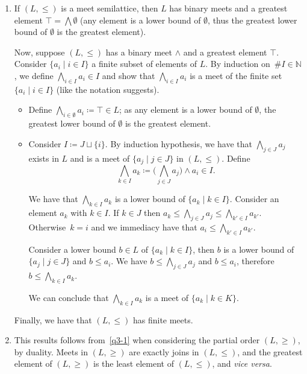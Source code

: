 \documentclass[fontsize=16pt,a4paper,DIV=17,parskip=half]{scrartcl}
\let\mathds\mathbb
\theoremstyle{definition}
\begin{document}
  \begin{enumerate}
    \item If $(L, \le)$ is a meet semilattice, then $L$ has binary meets and a greatest element $\top = \bigwedge \emptyset$ (any element is a lower bound of $\emptyset$, thus the greatest lower bound of $\emptyset$ is the greatest element).

      Now, suppose $(L, \le)$ has a binary meet $\wedge$ and a greatest element $\top$.
      Consider $\{a_i  \mid i \in I\}$ a finite subset of elements of $L$.
      By induction on~$\# I \in \mathds{N}$, we define $\bigwedge_{i \in I} a_i \in I$ and show that $\bigwedge_{i \in I}a_i$ is a meet of the finite set $\{a_i  \mid  i \in I\}$ (like the notation suggests).
      \begin{itemize}
        \item Define $\bigwedge_{i \in \emptyset} a_i \coloneqq \top \in L$; as any element is a lower bound of $\emptyset$, the greatest lower bound of $\emptyset$ is the greatest element.
        \item Consider $I \coloneqq J \sqcup \{i\}$.
          By induction hypothesis, we have that $\bigwedge_{j \in J} a_j$ exists in $L$ and is a meet of $\{a_j  \mid j \in J\}$ in $(L, \le)$.
          Define \[
          \bigwedge_{k \in I} a_k \coloneqq \big(\bigwedge_{j \in J} a_j \big) \wedge a_i \in I
          .\]

          We have that $\bigwedge_{k \in I} a_k$ is a lower bound of $\{a_k  \mid k \in I\}$. Consider an element $a_k$ with $k \in I$.
          If $k \in J$ then $a_k \le \bigwedge_{j \in J}a_j \le \bigwedge_{k' \in I} a_{k'}$.
          Otherwise~$k = i$ and we immediacy have that $a_i \le \bigwedge_{k' \in I} a_{k'}$.

          Consider a lower bound $b \in L$ of $\{a_k  \mid k \in I\}$, then $b$ is a lower bound of $\{a_j  \mid j \in J\}$ and $b \le a_i$.
          We have $b \le \bigwedge_{j \in J} a_j$ and $b \le a_i$, therefore $b \le \bigwedge_{k \in I} a_k$.

          We can conclude that $\bigwedge_{k \in I} a_k$ is a meet of $\{a_k  \mid k \in K\}$.
      \end{itemize}
      Finally, we have that $(L, \le)$ has finite meets.
    \item This results follows from~\ref{q3-1} when considering the partial order $(L, \ge)$, by duality.
      Meets in $(L, \ge)$ are exactly joins in $(L, \le)$, and the greatest element of $(L, \ge)$ is the least element of $(L, \le)$, and \textit{vice versa}.
  \end{enumerate}
\end{document}
